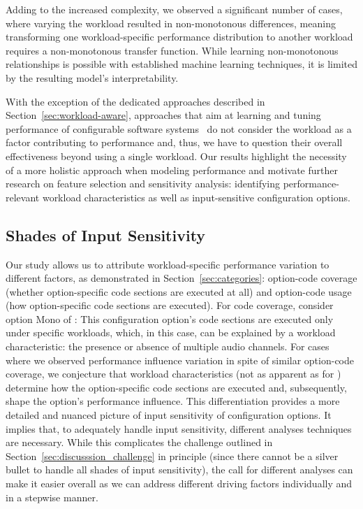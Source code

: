Adding to the increased complexity, we observed a significant number of cases, where varying the workload resulted in non-mo\-no\-to\-nous differences, meaning transforming one workload-specific performance distribution to another workload requires a non-mono\-tonous transfer function. While learning non-mo\-no\-to\-nous relationships is possible with established machine learning techniques, it is limited by the resulting model's interpretability. 

With the exception of the dedicated approaches described in Section~\ref{sec:workload-aware}, approaches that aim at learning and tuning performance of configurable software systems~\cite{siegmundPerformanceinfluenceModelsHighly2015,haDeepPerf2019,perfAL,guoVariabilityawarePerformancePrediction2013,sarkarCostEfficientSamplingPerformance,guo_2018_data,fourier_learning_2015,perLasso} do not consider the workload as a factor contributing to performance and, thus, we have to question their overall effectiveness beyond using a single workload. Our results highlight the necessity of a more holistic approach when modeling performance and motivate further research on feature selection and sensitivity analysis: identifying performance-relevant workload characteristics as well as input-sensitive configuration options.

\subsection{Shades of Input Sensitivity}
Our study allows us to attribute workload-specific performance variation to different factors, as demonstrated in Section~\ref{sec:categories}: option-code coverage (whether option-specific code sections are executed at all) and option-code usage (how option-specific code sections are executed). For code coverage, consider option \textsf{Mono} of \jumper: This configuration option's code sections are executed only under specific workloads, which, in this case, can be explained by a workload characteristic: the presence or absence of multiple audio channels. For cases where we observed performance influence variation in spite of similar option-code coverage, we conjecture that workload characteristics (not as apparent as for \jumper) determine how the option-specific code sections are executed and, subsequently, shape the option’s performance influence. 
This differentiation provides a more detailed and nuanced picture of input sensitivity of configuration options. It implies that, to adequately handle input sensitivity, different analyses techniques are necessary. While this complicates the challenge outlined in Section~\ref{sec:discusssion_challenge} in principle (since there cannot be a silver bullet to handle all shades of input sensitivity), the call for different analyses can make it easier overall as we can address different driving factors individually and in a stepwise manner.

